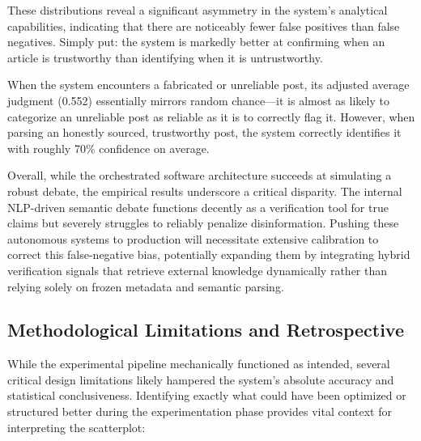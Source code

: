 These distributions reveal a significant asymmetry in the system's analytical capabilities, indicating that there are noticeably fewer false positives than false negatives. Simply put: the system is markedly better at confirming when an article is trustworthy than identifying when it is untrustworthy.

When the system encounters a fabricated or unreliable post, its adjusted average judgment (0.552) essentially mirrors random chance—it is almost as likely to categorize an unreliable post as reliable as it is to correctly flag it. However, when parsing an honestly sourced, trustworthy post, the system correctly identifies it with roughly 70\% confidence on average.

Overall, while the orchestrated software architecture succeeds at simulating a robust debate, the empirical results underscore a critical disparity. The internal NLP-driven semantic debate functions decently as a verification tool for true claims but severely struggles to reliably penalize disinformation. Pushing these autonomous systems to production will necessitate extensive calibration to correct this false-negative bias, potentially expanding them by integrating hybrid verification signals that retrieve external knowledge dynamically rather than relying solely on frozen metadata and semantic parsing.

\subsection{Methodological Limitations and Retrospective}
While the experimental pipeline mechanically functioned as intended, several critical design limitations likely hampered the system's absolute accuracy and statistical conclusiveness. Identifying exactly what could have been optimized or structured better during the experimentation phase provides vital context for interpreting the scatterplot:

